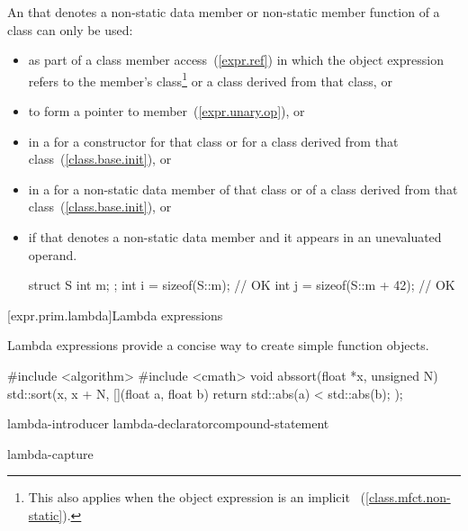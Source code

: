 \pnum
An  that denotes a non-static data member or
non-static member function of a class can only be used:

\begin{itemize}
\item as part of a class member access~(\ref{expr.ref}) in which the
object expression
refers to the member's class\footnote{This also applies when the object expression
is an implicit ~(\ref{class.mfct.non-static}).} or a class derived from
that class, or

\item to form a pointer to member~(\ref{expr.unary.op}), or

\item in a  for a constructor for that class
or for a class derived from that class~(\ref{class.base.init}), or

\item in a  for a non-static data member
of that class or of a class derived from that class~(\ref{class.base.init}), or

\item if that  denotes a non-static data member
and it appears in an unevaluated operand.
\enterexample

\begin{codeblock}
struct S {
  int m;
};
int i = sizeof(S::m);           // OK
int j = sizeof(S::m + 42);      // OK
\end{codeblock}
\exitexample
\end{itemize}

[expr.prim.lambda]{Lambda expressions}%

\pnum
Lambda expressions provide a concise way to create simple function objects.
\enterexample

\begin{codeblock}
#include <algorithm>
#include <cmath>
void abssort(float *x, unsigned N) {
  std::sort(x, x + N,
    [](float a, float b) {
      return std::abs(a) < std::abs(b);
    });
}
\end{codeblock}
\exitexample

\begin{bnf}
\br
    lambda-introducer lambda-declarator\opt compound-statement
\end{bnf}

\begin{bnf}
\br
    \terminal{[} lambda-capture\opt \terminal{]}
\end{bnf}

